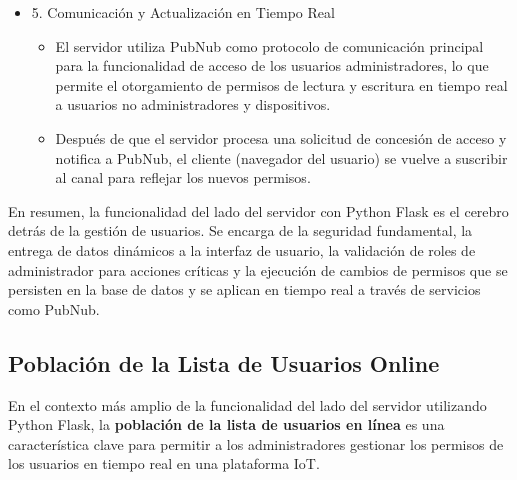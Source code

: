 \documentclass{report}
\begin{document}
\begin{itemize}
    \item 5. Comunicación y Actualización en Tiempo Real
    \begin{itemize}
        \item El servidor utiliza  PubNub  como protocolo de comunicación principal para la funcionalidad de acceso de los usuarios administradores, 
        lo que permite el otorgamiento de permisos de lectura y escritura en tiempo real a usuarios no administradores y dispositivos.
        \item Después de que el servidor procesa una solicitud de concesión de acceso y notifica a PubNub, el cliente (navegador del usuario) 
        se vuelve a suscribir al canal para reflejar los nuevos permisos.
    \end{itemize}
\end{itemize}

En resumen, la funcionalidad del lado del servidor con Python Flask es el cerebro detrás de la gestión de usuarios. Se encarga de la seguridad 
fundamental, la entrega de datos dinámicos a la interfaz de usuario, la validación de roles de administrador para acciones críticas y la 
ejecución de cambios de permisos que se persisten en la base de datos y se aplican en tiempo real a través de servicios como PubNub.

\subsection{Población de la Lista de Usuarios Online}
En el contexto más amplio de la funcionalidad del lado del servidor utilizando Python Flask, la \textbf{población de la lista de usuarios en línea} es 
una característica clave para permitir a los administradores gestionar los permisos de los usuarios en tiempo real en una plataforma IoT.
\end{document}
